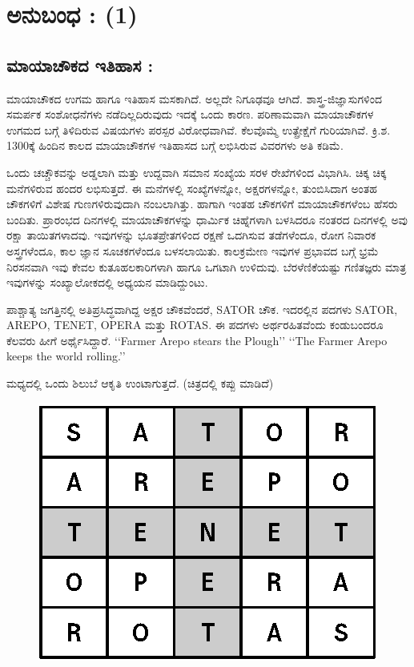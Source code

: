 
\chapter*{ಅನುಬಂಧ : (1)}

\section*{ಮಾಯಾಚೌಕದ ಇತಿಹಾಸ :}

ಮಾಯಾಚೌಕದ ಉಗಮ ಹಾಗೂ ಇತಿಹಾಸ ಮಸಕಾಗಿದೆ. ಅಲ್ಲದೇ ನಿಗೂಢವೂ ಆಗಿದೆ. ಶಾಸ್ತ್ರ-ಜಿಜ್ಞಾಸುಗಳಿಂದ ಸಮರ್ಪಕ ಸಂಶೋಧನೆಗಳು ನಡೆದಿಲ್ಲದಿರುವುದು ಇದಕ್ಕೆ ಒಂದು \break ಕಾರಣ. ಪರಿಣಾಮವಾಗಿ ಮಾಯಾಚೌಕಗಳ ಉಗಮದ ಬಗ್ಗೆ ತಿಳಿದಿರುವ ವಿಷಯಗಳು \break ಪರಸ್ಪರ ವಿರೋಧವಾಗಿವೆ. ಕೆಲವೊಮ್ಮೆ ಉತ್ಪ್ರೇಕ್ಷೆಗೆ ಗುರಿಯಾಗಿವೆ. ಕ್ರಿ.ಶ. 1300ಕ್ಕೆ ಹಿಂದಿನ ಕಾಲದ ಮಾಯಾಚೌಕಗಳ ಇತಿಹಾಸದ ಬಗ್ಗೆ ಲಭಿಸಿರುವ ವಿವರಗಳು ಅತಿ ಕಡಿಮೆ.

ಒಂದು ಚಚ್ಚೌಕವನ್ನು ಅಡ್ಡಲಾಗಿ ಮತ್ತು ಉದ್ದವಾಗಿ ಸಮಾನ ಸಂಖ್ಯೆಯ ಸರಳ ರೇಖೆಗಳಿಂದ ವಿಭಾಗಿಸಿ. ಚಿಕ್ಕ ಚಿಕ್ಕ ಮನೆಗಳಿರುವ ಹಂದರ ಲಭಿಸುತ್ತದೆ. ಈ ಮನೆಗಳಲ್ಲಿ ಸಂಖ್ಯೆಗಳನ್ನೋ, ಅಕ್ಷರಗಳನ್ನೋ, ತುಂಬಿಸಿದಾಗ ಅಂತಹ ಚೌಕಗಳಿಗೆ ವಿಶೇಷ ಗುಣಗಳಿರು\-ವುದಾಗಿ ನಂಬಲಾಗಿತ್ತು. ಹಾಗಾಗಿ ಇಂತಹ ಚೌಕಗಳಿಗೆ ಮಾಯಾಚೌಕಗಳೆಂಬ ಹೆಸರು ಬಂದಿತು. \linebreak ಪ್ರಾರಂಭದ ದಿನಗಳಲ್ಲಿ ಮಾಯಾಚೌಕಗಳನ್ನು ಧಾರ್ಮಿಕ ಚಿಹ್ನೆಗಳಾಗಿ ಬಳಸಿದರೂ ನಂತ\-ರದ ದಿನಗಳಲ್ಲಿ ಅವು ರಕ್ಷಾ ತಾಯಿತಗಳಾದವು. ಇವುಗಳನ್ನು ಭೂತಪ್ರೇತಗಳಿಂದ ರಕ್ಷಣೆ ಒದಗಿಸುವ ತಡೆಗಳೆಂದೂ, ರೋಗ ನಿವಾರಕ ಅಸ್ತ್ರಗಳೆಂದೂ, ಕಾಲ ಜ್ಞಾನ ಸೂಚಕಗಳೆಂದೂ ಬಳಸ\-ಲಾಯಿತು. ಕಾಲಕ್ರಮೇಣ ಇವುಗಳ ಪ್ರಭಾವದ ಬಗ್ಗೆ ಭ್ರಮೆ ನಿರಸನವಾಗಿ ಇವು ಕೇವಲ ಕುತೂ\-ಹಲಕಾರಿಗಳಾಗಿ ಹಾಗೂ ಒಗಟಾಗಿ ಉಳಿದುವು. ಬೆರಳೆಣಿಕೆಯಷ್ಟು ಗಣಿತಜ್ಞರು  \hbox{ಮಾತ್ರ} ಇವುಗಳನ್ನು ಸಂಖ್ಯಾಲೋಕದಲ್ಲಿ ಅಧ್ಯಯನ ಮಾಡಿದ್ದುಂಟು.

ಪಾಶ್ಚಾತ್ಯ ಜಗತ್ತಿನಲ್ಲಿ ಅತಿಪ್ರಸಿದ್ಧವಾಗಿದ್ದ ಅಕ್ಷರ ಚೌಕವೆಂದರೆ, SATOR ಚೌಕ. ಇದರಲ್ಲಿನ ಪದಗಳು SATOR, AREPO, TENET, OPERA ಮತ್ತು ROTAS. ಈ ಪದಗಳು ಅರ್ಥರಹಿತವೆಂದು ಕಂಡುಬಂದರೂ ಕೆಲವರು ಹೀಗೆ ಅರ್ಥೈಸಿದ್ದಾರೆ. ‘‘Farmer Arepo stears the Plough’’ ‘‘The Farmer Arepo keeps the world rolling.’’

ಮಧ್ಯದಲ್ಲಿ ಒಂದು ಶಿಲುಬೆ ಆಕೃತಿ ಉಂಟಾಗುತ್ತದೆ. (ಚಿತ್ರದಲ್ಲಿ ಕಪ್ಪು ಮಾಡಿದೆ)
\begin{figure}[H]
\includegraphics[scale=.9]{src/figures/chap9/fig9-1.eps}
\end{figure}

